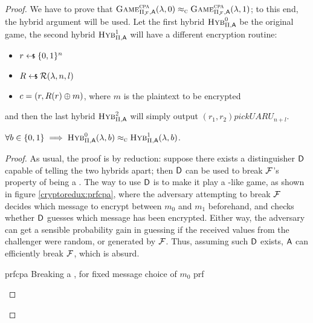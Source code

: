 \begin{proof}
    We have to prove that $\cryptog{cpa}[\Pi_{\F}](\lambda, 0) \compindist \cryptog{cpa}[\Pi_{\F}](\lambda, 1)$; to this end, the hybrid argument will be used. Let the first hybrid $\hybridg{0}$ be the original game, the second hybrid $\hybridg{1}$ will have a different encryption routine:

    \begin{itemize}
        \item $r \pickUAR \{0, 1\}^n$
        \item $R \pickUAR \R(\lambda, n, l)$
        \item $c = (r, R(r) \oplus m)$, where $m$ is the plaintext to be encrypted
    \end{itemize}

    and then the last hybrid $\hybridg{2}$ will simply output $(r_1, r_2) pickUAR U_{n+l}$.

    \begin{lemma}
        $\forall b \in \{0, 1\} \implies \hybridg{0}(\lambda, b) \compindist \hybridg{1}(\lambda, b)$.
    \end{lemma}

    \begin{proof}
        As usual, the proof is by reduction: suppose there exists a distinguisher $\textsf{D}$ capable of telling the two hybrids apart; then $\textsf{D}$ can be used to break $\mathcal{F}$'s property of being a \prf. The way to use $\textsf{D}$ is to make it play a \cpa-like game, as shown in figure \ref{cryptoredux:prfcpa}\footnotemark, where the adversary attempting to break $\mathcal{F}$ decides which message to encrypt between $m_0$ and $m_1$ beforehand, and checks whether $\textsf{D}$ guesses which message has been encrypted. Either way, the adversary can get a sensible probability gain in guessing if the received values from the challenger were random, or generated by $\mathcal{F}$. Thus, assuming such $\textsf{D}$ exists, $\textsf{A}$ can efficiently break $\mathcal{F}$, which is absurd.



        \begin{cryptoredux}
            {prfcpa}
            {Breaking a \prf, for fixed message choice of $m_0$}
            {prf}
            {}


\end{cryptoredux}
\end{proof}
\end{proof}
